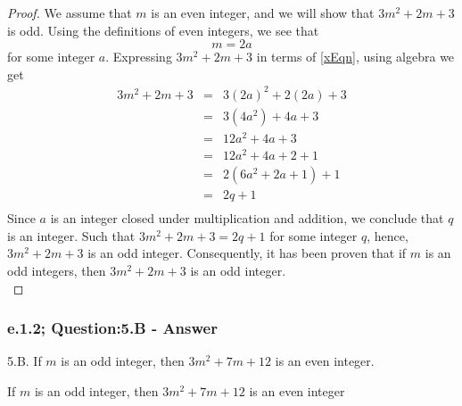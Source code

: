 \begin{proof}
We assume that $m$ is an even integer, and we will show that $3m^2 + 2m + 3$ is odd. Using the definitions of even integers, we see that
\begin{equation}
\label{xEqn}
m = 2a
\end{equation}
for some integer $a$. Expressing $3m^2 + 2m + 3$ in terms of \ref{xEqn}, using algebra we get
\begin{eqnarray*}
3m^2 + 2m + 3 & = & 3(2a)^2 + 2(2a) + 3  \nonumber \\
& = & 3(4a^2) + 4a + 3 \nonumber \\
& = & 12a^2 + 4a + 3 \nonumber \\
& = & 12a^2 + 4a + 2 + 1 \nonumber \\
& = & 2(6a^2 + 2a + 1) + 1 \nonumber \\
& = & 2q +1 \nonumber \\
\end{eqnarray*}
Since $a$ is an integer closed under multiplication and addition, we conclude that $q$ is an integer. Such that $3m^2 + 2m + 3 = 2q + 1$ for some integer $q$, hence, $3m^2 + 2m + 3$ is an odd integer. Consequently, it has been proven that if $m$ is an odd integers, then $3m^2 + 2m + 3$ is an odd integer. \\
\end{proof}



\subsubsection*{e.1.2; Question:5.B - Answer}
5.B. If $m$ is an odd integer, then $3m^2 + 7m + 12$ is an even integer. \\
\begin{tcolorbox}
\begin{theorem}
If $m$ is an odd integer, then $3m^2 + 7m + 12$ is an even integer
\end{theorem}
\end{tcolorbox}

